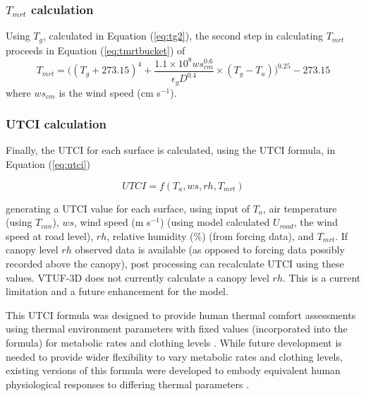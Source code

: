 \documentclass[preprint,12pt,authoryear]{elsarticle}
\begin{document}
 



\subsubsection{$T_{mrt}$ calculation}




Using $T_{g}$, calculated in Equation (\ref{eq:tg2}), the second step in calculating $T_{mrt}$ proceeds in Equation (\ref{eq:tmrtbucket}) of \cite{Kantor2011}
\begin{equation}\label{eq:tmrtbucket}
  T_{mrt} = 
  \bigg(
   (T_{g}+273.15)^{4} + 
    \frac{1.1 \times 10^{8}  ws_{cm}^{0.6}}{\epsilon_{g}  D^{0.4}}
    \times 
     (T_{g}-T_{a})
    \bigg)^{0.25} - 273.15
\end{equation}
 where $ws_{cm}$ is the wind speed (cm s$^{-1}$).


\subsubsection{UTCI calculation}
Finally, the UTCI for each surface is calculated, using the \cite{Brode2009u} UTCI formula, in Equation (\ref{eq:utci})

\begin{equation}\label{eq:utci}
  UTCI = f(T_{a}, ws, rh, T_{mrt})
\end{equation}

generating a UTCI value for each surface, using input of $T_{a}$, air temperature (using $T_{can}$), $ws$, wind speed (m s$^{-1}$) (using model calculated $U_{road}$, the wind speed at road level), $rh$, relative humidity (\%) (from forcing data), and $T_{mrt}$. If canopy level $rh$ observed data is available (as opposed to forcing data possibly recorded above the canopy), post processing can recalculate UTCI using these values. VTUF-3D does not currently calculate a canopy level $rh$. This is a current limitation and a future enhancement for the model.

This UTCI formula was designed to provide human thermal comfort assessments using thermal environment parameters with fixed values (incorporated into the formula) for metabolic rates and clothing levels \citep{Brode2012a}. While future development is needed to provide wider flexibility to vary metabolic rates and clothing levels, existing versions of this formula were developed to embody equivalent human physiological responses to differing thermal parameters \citep{Havenith2012,Fiala2012}.
\end{document}
